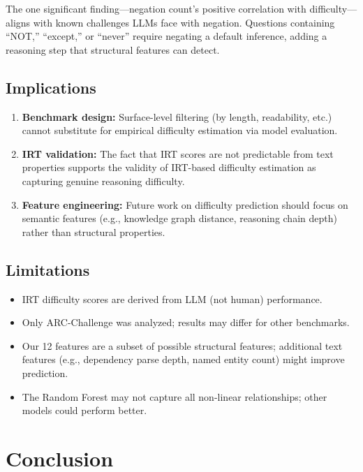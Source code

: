 \documentclass[11pt,a4paper]{article}
\begin{document}
The one significant finding---negation count's positive correlation with difficulty---aligns with known challenges LLMs face with negation. Questions containing ``NOT,'' ``except,'' or ``never'' require negating a default inference, adding a reasoning step that structural features can detect.

\subsection{Implications}

\begin{enumerate}
    \item \textbf{Benchmark design:} Surface-level filtering (by length, readability, etc.) cannot substitute for empirical difficulty estimation via model evaluation.
    \item \textbf{IRT validation:} The fact that IRT scores are not predictable from text properties supports the validity of IRT-based difficulty estimation as capturing genuine reasoning difficulty.
    \item \textbf{Feature engineering:} Future work on difficulty prediction should focus on semantic features (e.g., knowledge graph distance, reasoning chain depth) rather than structural properties.
\end{enumerate}

\subsection{Limitations}

\begin{itemize}
    \item IRT difficulty scores are derived from LLM (not human) performance.
    \item Only ARC-Challenge was analyzed; results may differ for other benchmarks.
    \item Our 12 features are a subset of possible structural features; additional text features (e.g., dependency parse depth, named entity count) might improve prediction.
    \item The Random Forest may not capture all non-linear relationships; other models could perform better.
\end{itemize}

\section{Conclusion}
\end{document}
